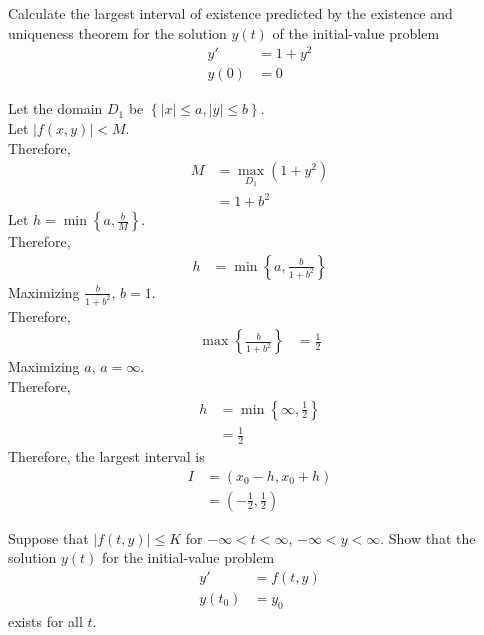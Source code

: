 \documentclass[fleqn, a4paper, 11pt, oneside]{amsart}
\theoremstyle{definition}
\theoremstyle{theorem}
\begin{document}
\begin{question}
	Calculate the largest interval of existence predicted by the existence and uniqueness theorem for the solution $y(t)$ of the initial-value problem
	\begin{align*}
		y'   & = 1 + y^2 \\
		y(0) & = 0
	\end{align*}
\end{question}

\begin{solution}
	Let the domain $D_1$ be $\left\{ |x| \le a , |y| \le b \right\}$.\\
	Let $|f(x,y)| < M$.\\
	Therefore,
	\begin{align*}
		M & = \max\limits_{D_1} (1 + y^2) \\
                  & = 1 + b^2
	\end{align*}
	Let $h = \min \left\{ a, \frac{b}{M} \right\}$.\\
	Therefore,
	\begin{align*}
		h & = \min \left\{ a, \frac{b}{1 + b^2} \right\}
	\end{align*}
	Maximizing $\frac{b}{1 + b^2}$, $b = 1$.\\
	Therefore,
	\begin{align*}
		\max \left\{ \frac{b}{1 + b^2} \right\} & = \frac{1}{2}
	\end{align*}
	Maximizing $a$, $a = \infty$.\\
	Therefore,
	\begin{align*}
		h & = \min \left\{ \infty , \frac{1}{2} \right\} \\
                  & = \frac{1}{2}
	\end{align*}
	Therefore, the largest interval is
	\begin{align*}
		I & = (x_0 - h , x_0 + h) \\
                  & = \left( -\frac{1}{2} , \frac{1}{2} \right)
	\end{align*}
\end{solution}

\begin{question}
	Suppose that $|f(t,y)| \le K$ for $-\infty < t < \infty$, $−\infty < y < \infty$.
	Show that the solution $y(t)$ for the initial-value problem
	\begin{align*}
		y' &= f(t,y)\\
		y(t_0) &= y_0
	\end{align*}
	exists for all $t$.
\end{question}
\end{document}
